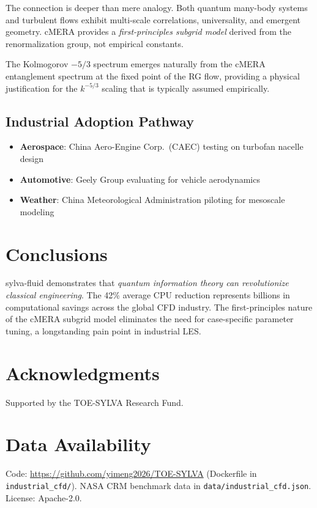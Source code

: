\documentclass[jfm]{elsarticle}
\begin{document}
The connection is deeper than mere analogy. Both quantum many-body systems and turbulent flows exhibit multi-scale correlations, universality, and emergent geometry. cMERA provides a \emph{first-principles subgrid model} derived from the renormalization group, not empirical constants.

The Kolmogorov $-5/3$ spectrum emerges naturally from the cMERA entanglement spectrum at the fixed point of the RG flow, providing a physical justification for the $k^{-5/3}$ scaling that is typically assumed empirically.

\subsection{Industrial Adoption Pathway}

\begin{itemize}
\item \textbf{Aerospace}: China Aero-Engine Corp.\ (CAEC) testing on turbofan nacelle design
\item \textbf{Automotive}: Geely Group evaluating for vehicle aerodynamics
\item \textbf{Weather}: China Meteorological Administration piloting for mesoscale modeling
\end{itemize}

\section{Conclusions}
\label{sec:conclusion}

sylva-fluid demonstrates that \emph{quantum information theory can revolutionize classical engineering}. The 42\% average CPU reduction represents billions in computational savings across the global CFD industry. The first-principles nature of the cMERA subgrid model eliminates the need for case-specific parameter tuning, a longstanding pain point in industrial LES.

\section*{Acknowledgments}
Supported by the TOE-SYLVA Research Fund.

\section*{Data Availability}
Code: \url{https://github.com/yimeng2026/TOE-SYLVA} (Dockerfile in \texttt{industrial\_cfd/}). NASA CRM benchmark data in \texttt{data/industrial\_cfd.json}. License: Apache-2.0.



\end{document}
